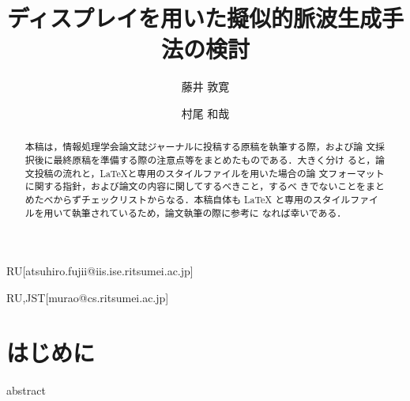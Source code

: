 \documentclass[submit,techrep]{ipsj}
\begin{document}
\title{ディスプレイを用いた擬似的脈波生成手法の検討}


\author{藤井 敦寛}{}{RU}[atsuhiro.fujii@iis.ise.ritsumei.ac.jp]
\author{村尾 和哉}{}{RU,JST}[murao@cs.ritsumei.ac.jp]

\begin{abstract}
	本稿は，情報処理学会論文誌ジャーナルに投稿する原稿を執筆する際，および論
	文採択後に最終原稿を準備する際の注意点等をまとめたものである．大きく分け
	ると，論文投稿の流れと，\LaTeX と専用のスタイルファイルを用いた場合の論
	文フォーマットに関する指針，および論文の内容に関してするべきこと，するべ
	きでないことをまとめたべからずチェックリストからなる．本稿自体も \LaTeX
	と専用のスタイルファイルを用いて執筆されているため，論文執筆の際に参考に
	なれば幸いである．
\end{abstract}

\maketitle

\section{はじめに}
abstract
\end{document}
